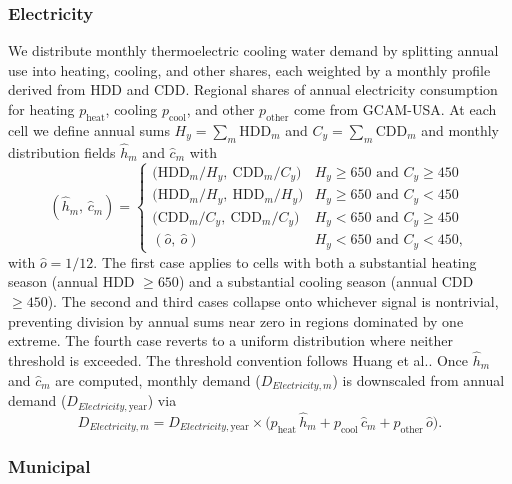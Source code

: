\documentclass[fleqn,10pt]{wlscirep}
\begin{document}
\subsubsection*{Electricity}

We distribute monthly thermoelectric cooling water demand by splitting annual use into heating, cooling, and other shares, each weighted by a monthly profile derived from HDD and CDD. Regional shares of annual electricity consumption for heating $p_{\mathrm{heat}}$, cooling $p_{\mathrm{cool}}$, and other $p_{\mathrm{other}}$ come from GCAM-USA. At each cell we define annual sums $H_y = \sum_m \text{HDD}_m$ and $C_y = \sum_m \text{CDD}_m$ and monthly distribution fields $\hat{h}_m$ and $\hat{c}_m$ with
\begin{equation}
(\hat{h}_m,\,\hat{c}_m) =
\begin{cases}
\big(\text{HDD}_m / H_y,\ \text{CDD}_m / C_y\big)      & H_y \ge 650 \text{ and } C_y \ge 450 \\[2pt]
\big(\text{HDD}_m / H_y,\ \text{HDD}_m / H_y\big)      & H_y \ge 650 \text{ and } C_y < 450 \\[2pt]
\big(\text{CDD}_m / C_y,\ \text{CDD}_m / C_y\big)      & H_y < 650 \text{ and } C_y \ge 450 \\[2pt]
(\hat{o},\ \hat{o})                                          & H_y < 650 \text{ and } C_y < 450,
\end{cases}
\label{eq:elec-cases}
\end{equation}
with $\hat{o} = 1/12$. 
The first case applies to cells with both a substantial heating season (annual HDD $\ge 650$) and a substantial cooling season (annual CDD $\ge 450$). The second and third cases collapse onto whichever signal is nontrivial, preventing division by annual sums near zero in regions dominated by one extreme. The fourth case reverts to a uniform distribution where neither threshold is exceeded. The threshold convention follows Huang et al.\cite{Huang2018}. Once $\hat{h}_m$ and $\hat{c}_m$ are computed, monthly demand ($D_{Electricity,m}$) is downscaled from annual demand ($D_{Electricity,\mathrm{year}}$) via
\begin{equation}
D_{Electricity,m} = D_{Electricity,\mathrm{year}} \times \big(p_{\mathrm{heat}}\,\hat{h}_m + p_{\mathrm{cool}}\,\hat{c}_m + p_{\mathrm{other}}\,\hat{o}\big).
\label{eq:elec-demand}
\end{equation}


\subsubsection*{Municipal}
\end{document}
